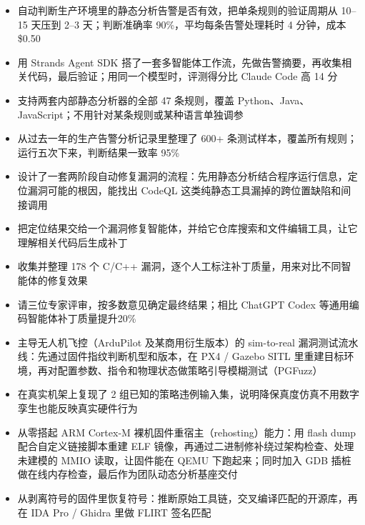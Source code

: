 \begin{itemize}
\item 自动判断生产环境里的静态分析告警是否有效，把单条规则的验证周期从 10--15 天压到 2--3 天；判断准确率 90\%，平均每条告警处理耗时 4 分钟，成本 \$0.50
\item 用 Strands Agent SDK 搭了一套多智能体工作流，先做告警摘要，再收集相关代码，最后验证；用同一个模型时，评测得分比 Claude Code 高 14 分
\item 支持两套内部静态分析器的全部 47 条规则，覆盖 Python、Java、JavaScript；不用针对某条规则或某种语言单独调参
\item 从过去一年的生产告警分析记录里整理了 600+ 条测试样本，覆盖所有规则；运行五次下来，判断结果一致率 95\%
\end{itemize}
\begin{itemize}
\item 设计了一套两阶段自动修复漏洞的流程：先用静态分析结合程序运行信息，定位漏洞可能的根因，能找出 CodeQL 这类纯静态工具漏掉的跨位置缺陷和间接调用
\item 把定位结果交给一个漏洞修复智能体，并给它仓库搜索和文件编辑工具，让它理解相关代码后生成补丁
\item 收集并整理 178 个 C/C++ 漏洞，逐个人工标注补丁质量，用来对比不同智能体的修复效果
\item 请三位专家评审，按多数意见确定最终结果；相比 ChatGPT Codex 等通用编码智能体补丁质量提升20\%
\end{itemize}
\begin{itemize}
\item 主导无人机飞控（ArduPilot 及某商用衍生版本）的 sim-to-real 漏洞测试流水线：先通过固件指纹判断机型和版本，在 PX4 / Gazebo SITL 里重建目标环境，再对配置参数、指令和物理状态做策略引导模糊测试（PGFuzz）
\item 在真实机架上复现了 2 组已知的策略违例输入集，说明降保真度仿真不用数字孪生也能反映真实硬件行为
\item 从零搭起 ARM Cortex-M 裸机固件重宿主（rehosting）能力：用 flash dump 配合自定义链接脚本重建 ELF 镜像，再通过二进制修补绕过架构检查、处理未建模的 MMIO 读取，让固件能在 QEMU 下跑起来；同时加入 GDB 插桩做在线内存检查，最后作为团队动态分析基座交付
\item 从剥离符号的固件里恢复符号：推断原始工具链，交叉编译匹配的开源库，再在 IDA Pro / Ghidra 里做 FLIRT 签名匹配
\end{itemize}
